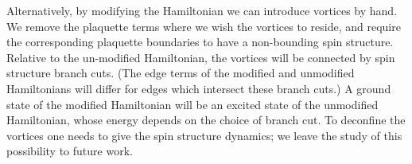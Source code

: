 Alternatively, by modifying the Hamiltonian we can introduce vortices by hand. 
We remove the plaquette terms where we wish the vortices to reside, 
and require the corresponding plaquette boundaries
to have a non-bounding spin structure.
Relative to the un-modified Hamiltonian, 
the vortices will be connected by spin structure branch cuts.
(The edge terms of the modified and unmodified Hamiltonians will differ for edges which intersect these branch cuts.)
A ground state of the modified Hamiltonian will be an excited state of the unmodified Hamiltonian, 
whose energy depends on the choice of branch cut.
To deconfine the vortices one needs to give the spin structure dynamics; 
we leave the study of this possibility to future work.

